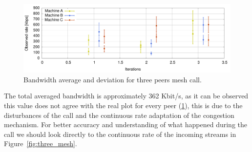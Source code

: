 \begin{figure}[h]
  \centering
    \includegraphics[width=1\textwidth]{./figures/mesh_mean_deviation_bw.pdf}
      \caption[Bandwidth average and deviation for three peers mesh call]{Bandwidth average and deviation for three peers mesh call.}
	\label{fig:bwThreeMesh}
\end{figure}

The total averaged bandwidth is approximately 362 Kbit/s, as it can be observed this value does not agree with the real plot for every peer (\ref{fig:bwThreeMesh}), this is due to the disturbances of the call and the continuous rate adaptation of the congestion mechanism. For better accuracy and understanding of what happened during the call we should look directly to the continuous rate of the incoming streams in Figure~\ref{fig:three_mesh}.

